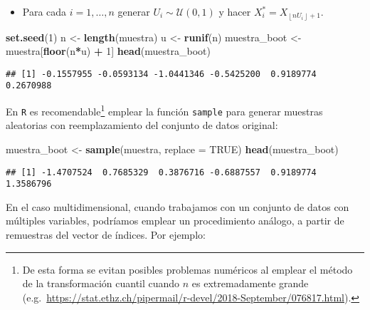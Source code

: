 \documentclass[
]{book}
\newenvironment{Shaded}{\begin{snugshade}}{\end{snugshade}}
\newcommand{\DataTypeTok}[1]{\textcolor[rgb]{0.13,0.29,0.53}{#1}}
\newcommand{\DecValTok}[1]{\textcolor[rgb]{0.00,0.00,0.81}{#1}}
\newcommand{\KeywordTok}[1]{\textcolor[rgb]{0.13,0.29,0.53}{\textbf{#1}}}
\newcommand{\NormalTok}[1]{#1}
\newcommand{\OperatorTok}[1]{\textcolor[rgb]{0.81,0.36,0.00}{\textbf{#1}}}
\newcommand{\OtherTok}[1]{\textcolor[rgb]{0.56,0.35,0.01}{#1}}
\newcommand{\StringTok}[1]{\textcolor[rgb]{0.31,0.60,0.02}{#1}}
\providecommand{\tightlist}{%
  \setlength{\itemsep}{0pt}\setlength{\parskip}{0pt}}
\theoremstyle{break}
\theoremstyle{definition}
\theoremstyle{definition}
\theoremstyle{definition}
\theoremstyle{remark}
\begin{document}
\begin{itemize}
\tightlist
\item
  Para cada \(i=1,\ldots ,n\)
  generar \(U_i\sim \mathcal{U}\left( 0,1 \right)\) y
  hacer \(X_i^{\ast}=X_{\left\lfloor nU_i\right\rfloor +1}\).
\end{itemize}

\begin{Shaded}
\begin{Highlighting}[]
\KeywordTok{set.seed}\NormalTok{(}\DecValTok{1}\NormalTok{)}
\NormalTok{n <-}\StringTok{ }\KeywordTok{length}\NormalTok{(muestra)}
\NormalTok{u <-}\StringTok{ }\KeywordTok{runif}\NormalTok{(n)}
\NormalTok{muestra_boot <-}\StringTok{ }\NormalTok{muestra[}\KeywordTok{floor}\NormalTok{(n}\OperatorTok{*}\NormalTok{u) }\OperatorTok{+}\StringTok{ }\DecValTok{1}\NormalTok{]}
\KeywordTok{head}\NormalTok{(muestra_boot)}
\end{Highlighting}
\end{Shaded}

\begin{verbatim}
## [1] -0.1557955 -0.0593134 -1.0441346 -0.5425200  0.9189774  0.2670988
\end{verbatim}

En \texttt{R} es recomendable\footnote{De esta forma se evitan posibles problemas numéricos
  al emplear el método de la transformación cuantil cuando \(n\) es extremadamente grande
  (e.g.~\url{https://stat.ethz.ch/pipermail/r-devel/2018-September/076817.html}).}
emplear la función \texttt{sample} para generar muestras aleatorias con reemplazamiento
del conjunto de datos original:

\begin{Shaded}
\begin{Highlighting}[]
\NormalTok{muestra_boot <-}\StringTok{ }\KeywordTok{sample}\NormalTok{(muestra, }\DataTypeTok{replace =} \OtherTok{TRUE}\NormalTok{)}
\KeywordTok{head}\NormalTok{(muestra_boot)}
\end{Highlighting}
\end{Shaded}

\begin{verbatim}
## [1] -1.4707524  0.7685329  0.3876716 -0.6887557  0.9189774  1.3586796
\end{verbatim}

En el caso multidimensional, cuando trabajamos con un conjunto de datos
con múltiples variables,
podríamos emplear un procedimiento análogo, a partir de remuestras del
vector de índices. Por ejemplo:
\end{document}
